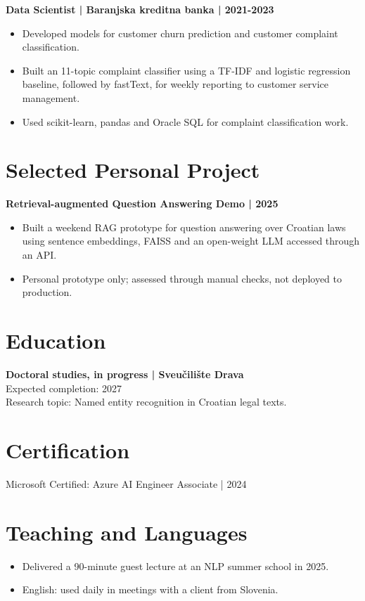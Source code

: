\documentclass[11pt,a4paper]{article}
\newcommand{\cvsection}[1]{\section*{#1}}
\begin{document}
\textbf{Data Scientist | Baranjska kreditna banka | 2021-2023}
\begin{itemize}
\item Developed models for customer churn prediction and customer complaint classification.
\item Built an 11-topic complaint classifier using a TF-IDF and logistic regression baseline, followed by fastText, for weekly reporting to customer service management.
\item Used scikit-learn, pandas and Oracle SQL for complaint classification work.
\end{itemize}

\cvsection{Selected Personal Project}
\textbf{Retrieval-augmented Question Answering Demo | 2025}
\begin{itemize}
\item Built a weekend RAG prototype for question answering over Croatian laws using sentence embeddings, FAISS and an open-weight LLM accessed through an API.
\item Personal prototype only; assessed through manual checks, not deployed to production.
\end{itemize}

\cvsection{Education}
\textbf{Doctoral studies, in progress | Sveučilište Drava}\\
Expected completion: 2027\\
Research topic: Named entity recognition in Croatian legal texts.

\cvsection{Certification}
Microsoft Certified: Azure AI Engineer Associate | 2024

\cvsection{Teaching and Languages}
\begin{itemize}
\item Delivered a 90-minute guest lecture at an NLP summer school in 2025.
\item English: used daily in meetings with a client from Slovenia.
\end{itemize}
\end{document}
